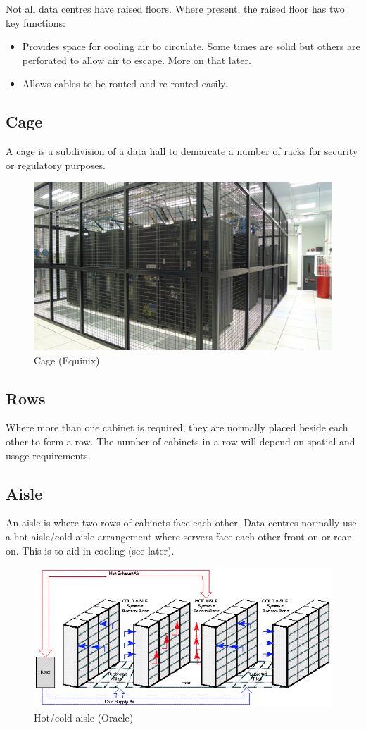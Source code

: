 \documentclass{pgnotes}
\begin{document}
Not all data centres have raised floors.
Where present, the raised floor has two key functions:
\begin{itemize}
\item Provides space for cooling air to circulate. Some times are solid but others are perforated to allow air to escape. More on that later.
\item Allows cables to be routed and re-routed easily. 
\end{itemize}

\subsection{Cage}

A cage is a subdivision of a data hall to demarcate a number of racks for security or regulatory purposes.

\begin{figure}[htbp]
  \centering
  \includegraphics[width=1.0\linewidth]{cage}
  \caption{Cage (Equinix)}
  \label{fig:cage}
\end{figure}


\subsection{Rows}

Where more than one cabinet is required, they are normally placed beside each other to form a row.
The number of cabinets in a row will depend on spatial and usage requirements.

\subsection{Aisle}

An aisle is where two rows of cabinets face each other.
Data centres normally use a hot aisle/cold aisle arrangement where servers face each other front-on or rear-on.
This is to aid in cooling (see later).

\begin{figure}[htbp]
  \centering
  \includegraphics[width=1.0\linewidth]{hot_cold_aisle_oracle}
  \caption{Hot/cold aisle (Oracle)}
  \label{fig:hot-cold-aisle}
\end{figure}
\end{document}
